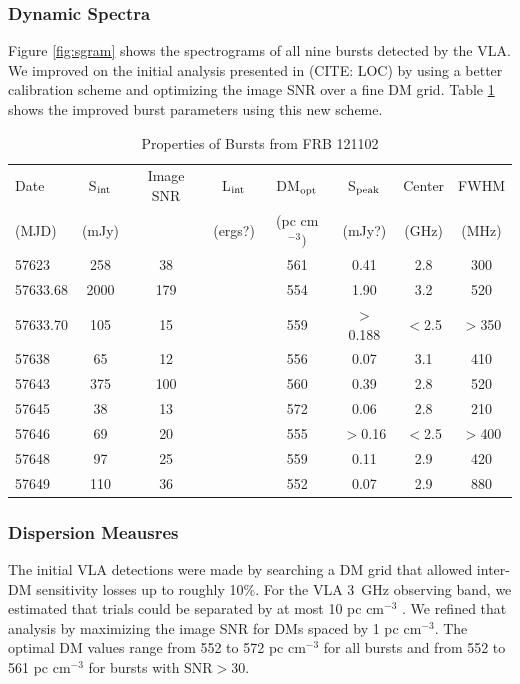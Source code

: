 \documentclass[twocolumn]{aastex61}
\newcommand{\frb}{FRB 121102}
\begin{document}
\subsubsection{Dynamic Spectra}
\label{sec:spec}
Figure \ref{fig:sgram} shows the spectrograms of all nine bursts detected by the VLA. We improved on the initial analysis presented in (CITE: LOC) by using a better calibration scheme and optimizing the image SNR over a fine DM grid. Table \ref{tab:spec} shows the improved burst parameters using this new scheme. 

\begin{table}
\caption{Properties of Bursts from \frb}
\centering
\begin{tabular}{lccccccc}
\hline
Date     & S$_{\rm{int}}$ & Image SNR & L$_{\rm{int}}$ & DM$_{\rm{opt}}$ & S$_{\rm{peak}}$ & Center & FWHM \\
(MJD)    & (mJy) &  & (ergs?) & (pc cm$^{-3})$ & (mJy?) & (GHz) & (MHz) \\ \hline
57623    & 258 & 38 & & 561 & 0.41             & 2.8 & 300 \\
57633.68 & 2000 & 179 & & 554 & 1.90           & 3.2 & 520 \\
57633.70 & 105 & 15 & & 559 & $>$0.188          & $<$2.5 & $>$350 \\
57638    & 65  & 12 & & 556 & 0.07             & 3.1 & 410 \\
57643    & 375 & 100 & & 560 & 0.39            & 2.8 & 520 \\
57645    & 38  & 13 & & 572 & 0.06             & 2.8 & 210 \\
57646    & 69  & 20 & & 555 & $>$0.16          & $<$2.5 & $>$400 \\
57648\tablenotemark{a}    & 97 & 25 & & 559 & 0.11 & 2.9 & 420 \\
57649    & 110 & 36 & & 552 & 0.07             & 2.9 & 880 \\ \hline
\end{tabular}
\label{tab:spec}
\end{table} 

\subsubsection{Dispersion Meausres}
The initial VLA detections were made by searching a DM grid that allowed inter-DM sensitivity losses up to roughly 10\%. For the VLA 3~GHz observing band, we estimated that trials could be separated by at most 10 pc cm$^{-3}$ \citep{2003ApJ...596.1142C}. We refined that analysis by maximizing the image SNR for DMs spaced by 1 pc cm$^{-3}$. The optimal DM values range from 552 to 572 pc cm$^{-3}$ for all bursts and from 552 to 561 pc cm$^{-3}$ for bursts with SNR$>30$. 
\end{document}
